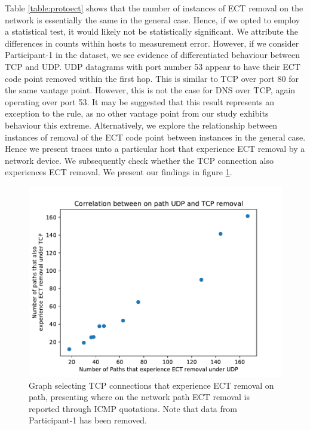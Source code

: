 \documentclass{l4proj}
\begin{document}
Table \ref{table:protoect} shows that the number of instances of ECT removal on the network is essentially the same in the general case. Hence, if we opted to employ a statistical test, it would likely not be statistically significant. We attribute the differences in counts within hosts to measurement error. However, if we consider Participant-1 in the dataset, we see evidence of differentiated behaviour between TCP and UDP. UDP datagrams with port number 53 appear to have their ECT code point removed within the first hop. This is similar to TCP over port 80 for the same vantage point. However, this is not the case for DNS over TCP, again operating over port 53. It may be suggested that this result represents an exception to the rule, as no other vantage point from our study exhibits behaviour this extreme. Alternatively, we explore the relationship between instances of removal of the ECT code point between instances in the general case. Hence we present traces unto a particular host that experience ECT removal by a network device. We subsequently check whether the TCP connection also experiences ECT removal. We present our findings in figure \ref{fig:tcpremove}.

\begin{figure}[H]
    \centering
    \includegraphics[scale=0.70]{dissertation/images/tcpudp.pdf}
    \caption{Graph selecting TCP connections that experience ECT removal on path, presenting where on the network path ECT removal is reported through ICMP quotations. Note that data from Participant-1 has been removed.}
    \label{fig:tcpremove}
\end{figure}
\end{document}
